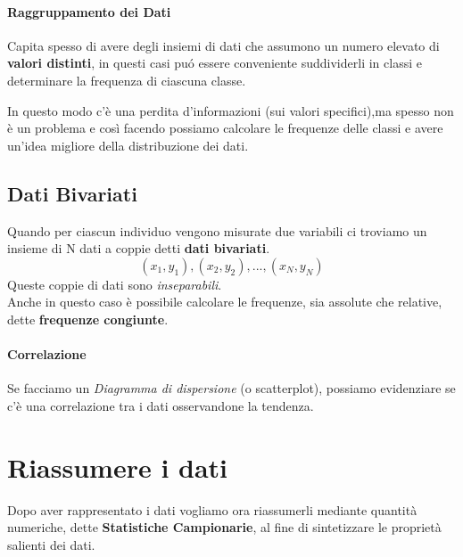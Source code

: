 \paragraph{Raggruppamento dei Dati}
Capita spesso di avere degli insiemi di dati che assumono un numero elevato di \textbf{valori distinti}, 
in questi casi puó essere conveniente suddividerli in classi e determinare la frequenza di ciascuna classe.

In questo modo c'è una perdita d'informazioni (sui valori specifici),ma spesso non è un problema e così facendo possiamo
calcolare le frequenze delle classi e avere un'idea migliore della distribuzione dei dati.

\subsection{Dati Bivariati}
Quando per ciascun individuo vengono misurate due variabili ci troviamo un insieme di N dati a coppie detti \textbf{dati bivariati}.
$$(x_1,y_1), (x_2,y_2), ..., (x_N, y_N)$$
Queste coppie di dati sono \emph{inseparabili}.\\
Anche in questo caso è possibile calcolare le frequenze, sia assolute che relative, dette \textbf{frequenze congiunte}.

\paragraph{Correlazione}
Se facciamo un \emph{Diagramma di dispersione} (o scatterplot), possiamo evidenziare se c'è una correlazione tra i dati osservandone la tendenza.

\section{Riassumere i dati}
Dopo aver rappresentato i dati vogliamo ora riassumerli mediante quantità numeriche, dette \textbf{Statistiche Campionarie}, al fine di sintetizzare le proprietà
salienti dei dati.

